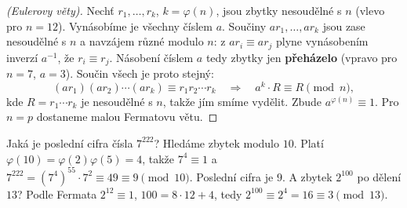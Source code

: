 \begin{center}
  \hspace{1.2cm}
\end{center}

\begin{proof}[(Eulerovy věty)]
  Nechť $r_1, \ldots, r_k$, $k = \varphi(n)$, jsou zbytky nesoudělné s $n$ (vlevo pro $n = 12$). Vynásobíme je všechny číslem $a$. Součiny $ar_1, \ldots, ar_k$ jsou zase nesoudělné s $n$ a navzájem různé modulo $n$: z $ar_i\equiv ar_j$ plyne vynásobením inverzí $a^{-1}$, že $r_i\equiv r_j$. Násobení číslem $a$ tedy zbytky jen \textbf{přeházelo} (vpravo pro $n = 7$, $a = 3$). Součin všech je proto stejný:
  \begin{equation*}
    (ar_1)(ar_2)\cdots(ar_k)\equiv r_1r_2\cdots r_k\quad\Longrightarrow\quad a^k\cdot R\equiv R\pmod{n},
  \end{equation*}
  kde $R = r_1\cdots r_k$ je nesoudělné s $n$, takže jím smíme vydělit. Zbude $a^{\varphi(n)}\equiv 1$. Pro $n = p$ dostaneme malou Fermatovu větu.
\end{proof}

\begin{example}
  Jaká je poslední cifra čísla $7^{222}$? Hledáme zbytek modulo $10$. Platí $\varphi(10) = \varphi(2)\varphi(5) = 4$, takže $7^4\equiv 1$ a $7^{222} = {(7^4)}^{55}\cdot 7^2\equiv 49\equiv 9\pmod{10}$. Poslední cifra je $9$. A zbytek $2^{100}$ po dělení $13$? Podle Fermata $2^{12}\equiv 1$, $100 = 8\cdot 12 + 4$, tedy $2^{100}\equiv 2^4 = 16\equiv 3\pmod{13}$.
\end{example}

